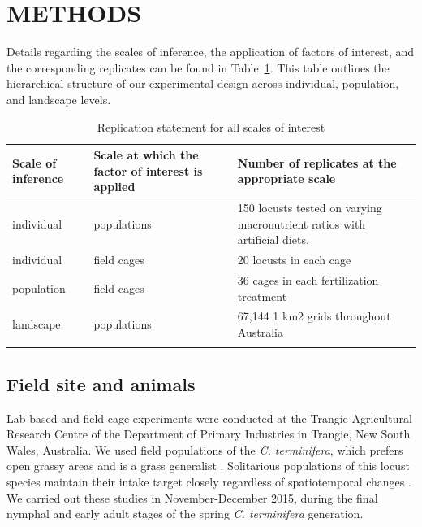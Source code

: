 \documentclass[
]{article}
\begin{document}
\section{METHODS}\label{methods}

Details regarding the scales of inference, the application of factors of
interest, and the corresponding replicates can be found in
Table~\ref{tbl-replication-statement}. This table outlines the
hierarchical structure of our experimental design across individual,
population, and landscape levels.

\begingroup
\setlength{}
\setlength{}\fontsize{8.2pt}{9.9pt}\selectfont

\begin{longtable}{@{\extracolsep{\fill}}lll}

\toprule
Scale of inference & Scale at which the factor of interest is applied & Number of replicates at the appropriate scale \\ 
\midrule\addlinespace[2.5pt]
individual & populations & 150 locusts tested on varying macronutrient ratios with artificial diets. \\ 
individual & field cages & 20 locusts in each cage \\ 
population & field cages & 36 cages in each fertilization treatment \\ 
landscape & populations & 67,144 1 km2 grids throughout Australia \\ 
\bottomrule

\caption{\label{tbl-replication-statement}Replication statement for all
scales of interest}

\tabularnewline

\end{longtable}

\endgroup

\subsection{Field site and animals}\label{field-site-and-animals}

Lab-based and field cage experiments were conducted at the Trangie
Agricultural Research Centre of the Department of Primary Industries in
Trangie, New South Wales, Australia. We used field populations of the
\emph{C. terminifera}, which prefers open grassy areas and is a grass
generalist \citep{key_general_1945}. Solitarious populations of this
locust species maintain their intake target closely regardless of
spatiotemporal changes \citep{lawton_mismatched_2021}. We carried out
these studies in November-December 2015, during the final nymphal and
early adult stages of the spring \emph{C. terminifera} generation.
\end{document}
